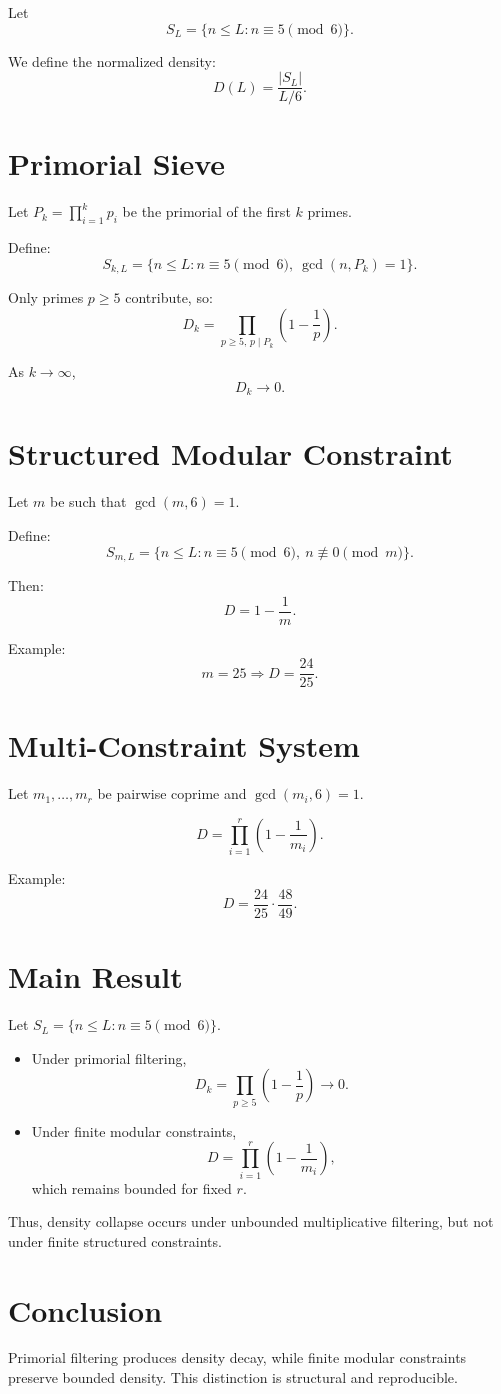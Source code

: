 \documentclass[11pt]{article}
\begin{document}
Let
\[
S_L = \{ n \leq L : n \equiv 5 \pmod{6} \}.
\]

We define the normalized density:
\[
D(L) = \frac{|S_L|}{L/6}.
\]

\section{Primorial Sieve}

Let $P_k = \prod_{i=1}^k p_i$ be the primorial of the first $k$ primes.

Define:
\[
S_{k,L} = \{ n \leq L : n \equiv 5 \pmod{6}, \ \gcd(n, P_k) = 1 \}.
\]

Only primes $p \geq 5$ contribute, so:
\[
D_k = \prod_{p \geq 5,\, p \mid P_k} \left(1 - \frac{1}{p}\right).
\]

As $k \to \infty$,
\[
D_k \to 0.
\]

\section{Structured Modular Constraint}

Let $m$ be such that $\gcd(m,6)=1$.

Define:
\[
S_{m,L} = \{ n \leq L : n \equiv 5 \pmod{6}, \ n \not\equiv 0 \pmod{m} \}.
\]

Then:
\[
D = 1 - \frac{1}{m}.
\]

Example:
\[
m = 25 \Rightarrow D = \frac{24}{25}.
\]

\section{Multi-Constraint System}

Let $m_1, \dots, m_r$ be pairwise coprime and $\gcd(m_i,6)=1$.

\[
D = \prod_{i=1}^r \left(1 - \frac{1}{m_i}\right).
\]

Example:
\[
D = \frac{24}{25} \cdot \frac{48}{49}.
\]

\section{Main Result}

Let $S_L = \{ n \leq L : n \equiv 5 \pmod{6} \}$.

\begin{itemize}
\item Under primorial filtering,
\[
D_k = \prod_{p \geq 5} \left(1 - \frac{1}{p}\right) \to 0.
\]

\item Under finite modular constraints,
\[
D = \prod_{i=1}^r \left(1 - \frac{1}{m_i}\right),
\]
which remains bounded for fixed $r$.
\end{itemize}

Thus, density collapse occurs under unbounded multiplicative filtering, but not under finite structured constraints.

\section{Conclusion}

Primorial filtering produces density decay, while finite modular constraints preserve bounded density. This distinction is structural and reproducible.
\end{document}

